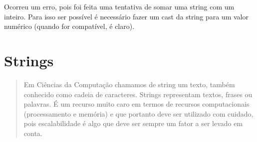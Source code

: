 \documentclass[letterpaper,10pt,brazil]{sphinxmanual}
\begin{document}
\begin{sphinxVerbatim}[commandchars=\\\{\}]
  
\end{sphinxVerbatim}

\begin{sphinxVerbatim}[commandchars=\\\{\}]
\end{sphinxVerbatim}

\begin{sphinxVerbatim}[commandchars=\\\{\}]
  
\end{sphinxVerbatim}

\begin{sphinxVerbatim}[commandchars=\\\{\}]
\end{sphinxVerbatim}

Ocorreu um erro, pois foi feita uma tentativa de somar uma string com um inteiro.
Para isso ser possível é necessário fazer um cast da string para um valor numérico (quando for compatível, é claro).

\begin{sphinxVerbatim}[commandchars=\\\{\}]
  
\end{sphinxVerbatim}

\begin{sphinxVerbatim}[commandchars=\\\{\}]
\end{sphinxVerbatim}


\chapter{Strings}
\label{\detokenize{content/str:strings}}\label{\detokenize{content/str::doc}}\begin{quote}

Em Ciências da Computação chamamos de string um texto, também conhecido como cadeia de caracteres.
Strings representam textos, frases ou palavras.
É um recurso muito caro em termos de recursos computacionais (processamento e memória) e que portanto deve ser utilizado com cuidado, pois escalabilidade é algo que deve ser sempre um fator a ser levado em conta.

\end{quote}
\end{document}
